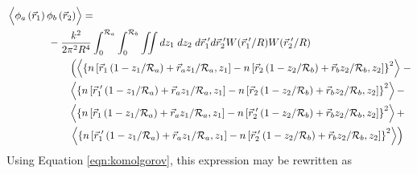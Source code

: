 \begin{equation}\label{eqn:prphase_n2}
\begin{aligned}
& \left\langle \vphantom{\hat{\phi}_{a}} \phi_{a}\left(\vec{r}_{1}\right) \phi_{b}\left(\vec{r}_{2}\right)\right\rangle = \\
&\quad\quad\quad\quad
-\frac{k^{2}}{2\pi^{2}R^{4}} \int_{0}^{\mathcal{R}_{a}}  \int_{0}^{\mathcal{R}_{b}} \iint dz_{1} \; dz_{2} \; d\vec{r}^{\;\prime}_{1}d\vec{r}^{\;\prime}_{2}  W(\vec{r}^{\;\prime}_{1}/R) W(\vec{r}^{\;\prime}_{2}/R)\\
&\quad\quad\quad\quad\quad\quad
\left(
\left\langle \left\{n\left[\vec{r}_{1}\left(1-z_{1}/\mathcal{R}_{a}\right) + \vec{r}_{a} z_{1}/\mathcal{R}_{a}, z_{1}\right] - 
 n\left[\vec{r}_{2}\left(1-z_{2}/\mathcal{R}_{b}\right) + \vec{r}_{b} z_{2}/\mathcal{R}_{b}, z_{2}\right] \right\}^{2} \right\rangle\right. - \\
&\quad\quad\quad\quad\quad\quad
\left\langle \left\{n\left[\vec{r}^{\;\prime}_{1}\left(1-z_{1}/\mathcal{R}_{a}\right) + \vec{r}_{a} z_{1}/\mathcal{R}_{a}, z_{1}\right] - 
 n\left[\vec{r}_{2}\left(1-z_{2}/\mathcal{R}_{b}\right) + \vec{r}_{b} z_{2}/\mathcal{R}_{b}, z_{2}\right] \right\}^{2} \right\rangle - \\
&\quad\quad\quad\quad\quad\quad
\left\langle \left\{n\left[\vec{r}_{1}\left(1-z_{1}/\mathcal{R}_{a}\right) + \vec{r}_{a} z_{1}/\mathcal{R}_{a}, z_{1}\right] - 
 n\left[\vec{r}^{\;\prime}_{2}\left(1-z_{2}/\mathcal{R}_{b}\right) + \vec{r}_{b} z_{2}/\mathcal{R}_{b}, z_{2}\right] \right\}^{2} \right\rangle + \\
&\quad\quad\quad\quad\quad\quad
\left.
\left\langle \left\{n\left[\vec{r}^{\;\prime}_{1}\left(1-z_{1}/\mathcal{R}_{a}\right) + \vec{r}_{a} z_{1}/\mathcal{R}_{a}, z_{1}\right] - 
 n\left[\vec{r}^{\;\prime}_{2}\left(1-z_{2}/\mathcal{R}_{b}\right) + \vec{r}_{b} z_{2}/\mathcal{R}_{b}, z_{2}\right] \right\}^{2} \right\rangle\right) \\
\end{aligned}
\end{equation}
Using Equation \ref{eqn:komolgorov}, this expression may be rewritten as
